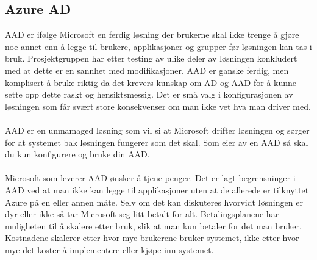 \subsection*{Azure AD}
AAD er ifølge Microsoft en ferdig løsning der brukerne skal ikke trenge å gjøre noe annet enn å legge til brukere, applikasjoner og grupper før løsningen kan tas i bruk. Prosjektgruppen har etter testing av ulike deler av løsningen konkludert med at dette er en sannhet med modifikasjoner. AAD er ganske ferdig, men komplisert å bruke riktig da det krevers kunskap om AD og AAD for å kunne sette opp dette raskt og hensiktsmessig. Det er små valg i konfigurasjonen av løsningen som får svært store konsekvenser om man ikke vet hva man driver med. 
\\
\\
AAD er en unmamaged løsning som vil si at Microsoft drifter løsningen og sørger for at systemet bak løsningen fungerer som det skal. Som eier av en AAD så skal du kun konfigurere og bruke din AAD. 
\\
\\
Microsoft som leverer AAD ønsker å tjene penger. Det er lagt begrensninger i AAD ved at man ikke kan legge til applikasjoner uten at de allerede er tilknyttet Azure på en eller annen måte. Selv om det kan diskuteres hvorvidt løsningen er dyr eller ikke så tar Microsoft seg litt betalt for alt. Betalingsplanene har muligheten til å skalere etter bruk, slik at man kun betaler for det man bruker. Kostnadene skalerer etter hvor mye brukerene bruker systemet, ikke etter hvor mye det koster å implementere eller kjøpe inn systemet.

